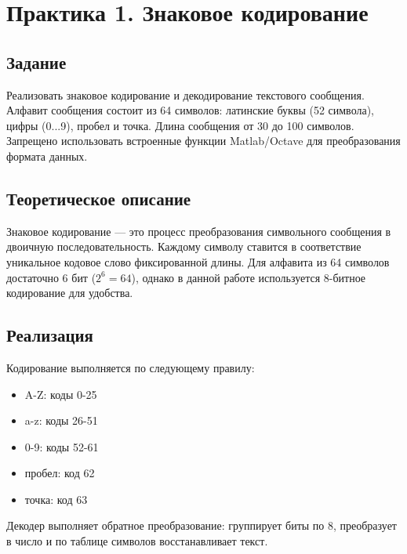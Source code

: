 \chapter{Практика 1. Знаковое кодирование}

\section{Задание}
Реализовать знаковое кодирование и декодирование текстового сообщения. Алфавит сообщения состоит из 64 символов: латинские буквы (52 символа), цифры (0...9), пробел и точка. Длина сообщения от 30 до 100 символов. Запрещено использовать встроенные функции Matlab/Octave для преобразования формата данных.

\section{Теоретическое описание}
Знаковое кодирование — это процесс преобразования символьного сообщения в двоичную последовательность. Каждому символу ставится в соответствие уникальное кодовое слово фиксированной длины. Для алфавита из 64 символов достаточно 6 бит ($2^6 = 64$), однако в данной работе используется 8-битное кодирование для удобства.

\section{Реализация}
Кодирование выполняется по следующему правилу:
\begin{itemize}
    \item A-Z: коды 0-25
    \item a-z: коды 26-51
    \item 0-9: коды 52-61
    \item пробел: код 62
    \item точка: код 63
\end{itemize}

Декодер выполняет обратное преобразование: группирует биты по 8, преобразует в число и по таблице символов восстанавливает текст.

